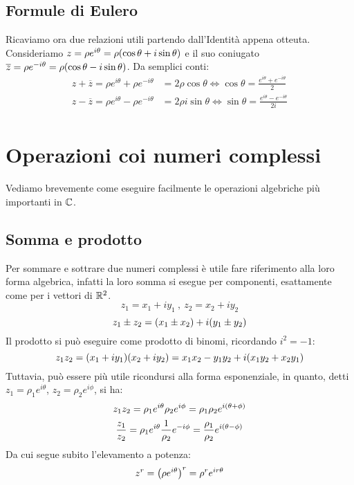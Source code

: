 {        \subsection{Formule di Eulero}
            Ricaviamo ora due relazioni utili partendo dall'Identit\`a appena otteuta. Consideriamo $z=\rho e^{i\theta}=\rho\qty(\cos\theta+i\sin\theta)$ e il suo coniugato $\overline{z}=\rho e^{-i\theta}=\rho\qty(\cos\theta-i\sin\theta)$.
            Da semplici conti:
            \begin{align*}
                z+\overline{z}=\rho e^{i\theta}+\rho e^{-i\theta}&=2\rho\cos\theta \iff \cos\theta=\frac{e^{i\theta}+e^{-i\theta}}{2}\\
                z-\overline{z}=\rho e^{i\theta}-\rho e^{-i\theta}&=2\rho i\sin\theta \iff \sin\theta=\frac{e^{i\theta}-e^{-i\theta}}{2i}\\
            \end{align*}
    \section{Operazioni coi numeri complessi}
    Vediamo brevemente come eseguire facilmente le operazioni algebriche pi\`u importanti in $\mathbb{C}$.
        \subsection{Somma e prodotto}
            Per sommare e sottrare due numeri complessi \`e utile fare riferimento alla loro forma algebrica, infatti la loro somma si esegue per componenti, esattamente come per i vettori di $\mathbb{R}^2$. $$z_1=x_1+iy_1\ ,\ z_2=x_2+iy_2$$ $$z_1\pm z_2=\qty(x_1\pm x_2)+i\qty(y_1\pm y_2)$$ Il prodotto si pu\`o eseguire come prodotto di binomi, ricordando $i^2=-1$: $$z_1z_2=\qty(x_1+iy_1)\qty(x_2+iy_2)=x_1x_2-y_1y_2+i\qty(x_1y_2+x_2y_1)$$
            Tuttavia, pu\`o essere pi\`u utile ricondursi alla forma esponenziale, in quanto, detti $z_1=\rho_1e^{i\theta}$, $z_2=\rho_2e^{i\phi}$, si ha: $$z_1z_2=\rho_1e^{i\theta}\rho_2e^{i\phi}=\rho_1\rho_2e^{i\qty(\theta+\phi)}$$ $$\frac{z_1}{z_2}=\rho_1e^{i\theta}\frac{1}{\rho_2}e^{-i\phi}=\frac{\rho_1}{\rho_2}e^{i\qty(\theta-\phi)}$$ Da cui segue subito l'elevamento a potenza: $$z^r=\qty(\rho e^{i\theta})^r=\rho^re^{ir\theta}$$
}